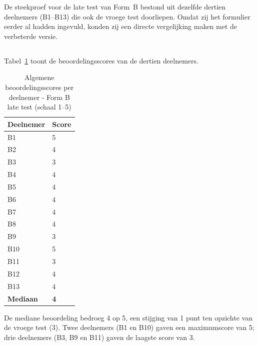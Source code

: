 De steekproef voor de late test van Form~B bestond uit dezelfde dertien deelnemers (B1–B13) die ook de vroege test doorliepen. Omdat zij het formulier eerder al hadden ingevuld, konden zij een directe vergelijking maken met de verbeterde versie.

\subsection{}

\subsubsection{}

Tabel~\ref{tab:laat-formb-ratings} toont de beoordelingsscores van de dertien deelnemers.

\begin{table}[h]
  \centering
  \caption[Algemene beoordelingsscores late test Form B]{Algemene beoordelingsscores per deelnemer - Form B late test (schaal 1–5)}
  \label{tab:laat-formb-ratings}
  \begin{tabular}{ll}
    \hline
    \textbf{Deelnemer} & \textbf{Score} \\
    \hline
    B1  & 5 \\
    B2  & 4 \\
    B3  & 3 \\
    B4  & 4 \\
    B5  & 4 \\
    B6  & 4 \\
    B7  & 4 \\
    B8  & 4 \\
    B9  & 3 \\
    B10 & 5 \\
    B11 & 3 \\
    B12 & 4 \\
    B13 & 4 \\
    \hline
    \textbf{Mediaan} & \textbf{4} \\
    \hline
  \end{tabular}
\end{table}

De mediane beoordeling bedroeg 4 op 5, een stijging van 1 punt ten opzichte van de vroege test (3). Twee deelnemers (B1 en B10) gaven een maximumscore van 5; drie deelnemers (B3, B9 en B11) gaven de laagste score van 3.

